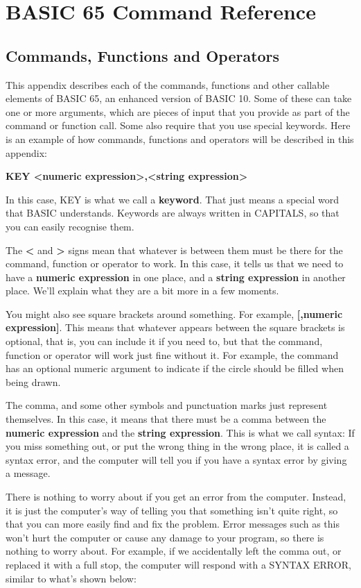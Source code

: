 \chapter{BASIC 65 Command Reference}

\section{Commands, Functions and Operators}

This appendix describes each of the commands, functions and other
callable elements of BASIC 65, an enhanced version of BASIC 10.
Some of these can take one or more arguments, which are pieces of input
that you provide as part of the command or function call.
Some also require that you use special keywords.
Here is an example of how commands, functions and operators will be
described in this appendix:

{\bf KEY <numeric expression>,<string expression> }

In this case, KEY is what we call a \textbf{keyword}. That just means
a special word that BASIC understands.
Keywords are always written in CAPITALS, so that you can easily
recognise them.

The {\bf <} and {\bf >} signs mean that whatever is between them must
be there for the command, function or operator to work.
In this case, it tells us that we need to have a
{\bf numeric expression} in one place, and a {\bf string expression}
in another place.
We'll explain what they are a bit more in a few moments.

You might also see square brackets around something. For example,
{\bf [,numeric expression]}.
This means that whatever appears between the square brackets is
optional, that is, you can include it if you need to, but
that the command, function or operator will work just fine without it.
For example, the  command has
an optional numeric argument to indicate if the circle should be filled
when being drawn.

The comma, and some other symbols and punctuation marks just represent themselves.
In this case, it means that there must be a comma between the
{\bf numeric expression} and the {\bf string expression}.
This is what we call syntax: If you miss something out, or put the
wrong thing in the wrong place, it is called a
syntax error, and the computer will tell you if you have a syntax error
by giving a  message.

There is nothing to worry about if you get an error from the computer.
Instead, it is just the computer's way of telling you that something
isn't quite right, so that you can more easily
find and fix the problem.
Error messages such as this won't hurt the computer or cause any damage to your program,
so there is nothing to worry about.
For example, if we accidentally left the comma out, or replaced it with
a full stop, the computer will respond with
a SYNTAX ERROR, similar to what's shown below:

